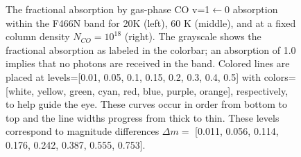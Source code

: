 \documentclass[times,astrosymb,twocolumn]{aastex631}
\def\rr#1{#1}
\begin{document}
\begin{figure}
    \centering
    \caption{The fractional absorption by gas-phase CO v=\rr{1$\leftarrow$0 absorption} within the F466N band for 20K (left), 60 K (middle), and at a fixed column density $N_{CO}=10^{18}$ \persc (right).
    The grayscale shows the fractional absorption as labeled in the colorbar; an absorption of 1.0 implies that no photons are received in the band.
    Colored lines are placed at levels=[0.01, 0.05, 0.1, 0.15, 0.2, 0.3, 0.4, 0.5] with colors=[white, yellow, green, cyan, red, blue, purple, orange], respectively, to help guide the eye.
    \rr{These curves occur in order from bottom to top and the line widths progress from thick to thin.}
    These levels correspond to magnitude differences $\Delta m=$ [0.011, 0.056, 0.114, 0.176, 0.242, 0.387, 0.555, 0.753].
    }
    \label{fig:COmodelgrids}
\end{figure}
\end{document}
